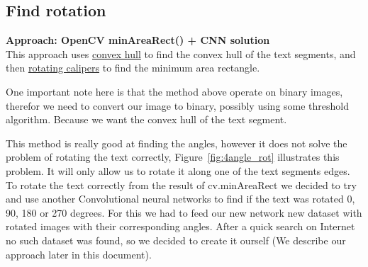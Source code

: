 \documentclass[Report.tex]{subfiles}
\begin{document}
\subsection{Find rotation}
\begin{flushleft}
  \textbf{Approach: OpenCV minAreaRect() + CNN solution} \\
  This approach uses \href{https://en.wikipedia.org/wiki/Convex_hull}{convex hull}
  to find the convex hull of the text segments, and then
  \href{https://en.wikipedia.org/wiki/Rotating_calipers}{rotating calipers} to
  find the minimum area rectangle. \par
  One important note here is that the method above operate on binary images, therefor we need to convert our image to binary, possibly using some threshold algorithm. Because we want the convex hull  of the text segment. \par
  This method is really good at finding the angles, however it does not solve the problem of rotating the text correctly, Figure~\ref{fig:4angle_rot} illustrates
  this problem. It will only allow us to rotate it along one of the text segments edges. To rotate the text correctly from the result of cv.minAreaRect we decided to try and use another Convolutional neural networks to find if the text was rotated 0, 90, 180 or 270 degrees. For this we had to feed our new network new dataset with rotated images with their corresponding angles. After a quick search on Internet no such dataset was found, so we decided to create it  ourself (We describe our approach later in this document).


\end{flushleft}
\end{document}

